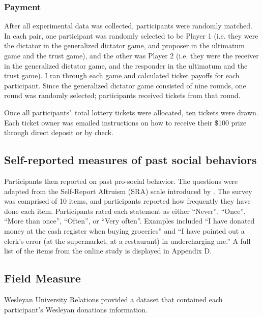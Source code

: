 \documentclass[12pt]{article}
\begin{document}
\subsubsection{Payment}

After all experimental data was collected, participants were randomly matched. In each pair, one participant was randomly selected to be Player 1 (i.e. they were the dictator in the generalized dictator game, and proposer in the ultimatum game and the trust game), and the other was Player 2 (i.e. they were the receiver in the generalized dictator game, and the responder in the ultimatum and the trust game). I ran through each game and calculated ticket payoffs for each participant. Since the generalized dictator game consisted of nine rounds, one round was randomly selected; participants received tickets from that round. 

Once all participants\rq \ total lottery tickets were allocated, ten tickets were drawn. Each ticket owner was emailed instructions on how to receive their \$100 prize through direct deposit or by check. 

\subsection{Self-reported measures of past social behaviors}

Participants then reported on past pro-social behavior. The questions were adapted from the Self-Report Altruism (SRA) scale introduced by \cite{rushton_chrisjohn_fekken_1981}. The survey was comprised of 10 items, and participants reported how frequently they have done each item. Participants rated each statement as either ``Never'', ``Once'', ``More than once'', ``Often'', or ``Very often''. Examples included ``I have donated money at the cash register when buying groceries'' and ``I have pointed out a clerk\rq s error (at the supermarket, at a restaurant) in undercharging me.'' A full list of the items from the online study is displayed in Appendix D. 

\subsection{Field Measure}

Wesleyan University Relations provided a dataset that contained each participant\rq s Wesleyan donations information.
\end{document}

